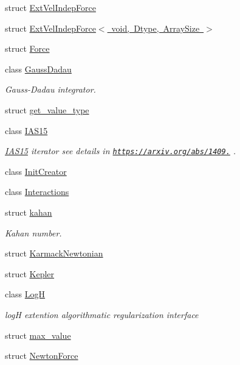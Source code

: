 \begin{DoxyCompactItemize}
struct \mbox{\hyperlink{struct_space_h_1_1_ext_vel_indep_force}{Ext\+Vel\+Indep\+Force}}
\item 
struct \mbox{\hyperlink{struct_space_h_1_1_ext_vel_indep_force_3_01void_00_01_dtype_00_01_array_size_01_4}{Ext\+Vel\+Indep\+Force$<$ void, Dtype, Array\+Size $>$}}
\item 
struct \mbox{\hyperlink{struct_space_h_1_1_force}{Force}}
\item 
class \mbox{\hyperlink{class_space_h_1_1_gauss_dadau}{Gauss\+Dadau}}
\begin{DoxyCompactList}\small\item\em Gauss-\/\+Dadau integrator. \end{DoxyCompactList}\item 
struct \mbox{\hyperlink{struct_space_h_1_1get__value__type}{get\+\_\+value\+\_\+type}}
\item 
class \mbox{\hyperlink{class_space_h_1_1_i_a_s15}{I\+A\+S15}}
\begin{DoxyCompactList}\small\item\em \mbox{\hyperlink{class_space_h_1_1_i_a_s15}{I\+A\+S15}} iterator see details in \href{https://arxiv.org/abs/1409.4779}{\tt https\+://arxiv.\+org/abs/1409.} . \end{DoxyCompactList}\item 
class \mbox{\hyperlink{class_space_h_1_1_init_creator}{Init\+Creator}}
\item 
class \mbox{\hyperlink{class_space_h_1_1_interactions}{Interactions}}
\item 
struct \mbox{\hyperlink{struct_space_h_1_1kahan}{kahan}}
\begin{DoxyCompactList}\small\item\em Kahan number. \end{DoxyCompactList}\item 
struct \mbox{\hyperlink{struct_space_h_1_1_karmack_newtonian}{Karmack\+Newtonian}}
\item 
struct \mbox{\hyperlink{struct_space_h_1_1_kepler}{Kepler}}
\item 
class \mbox{\hyperlink{class_space_h_1_1_log_h}{LogH}}
\begin{DoxyCompactList}\small\item\em logH extention algorithmatic regularization interface \end{DoxyCompactList}\item 
struct \mbox{\hyperlink{struct_space_h_1_1max__value}{max\+\_\+value}}
\item 
struct \mbox{\hyperlink{struct_space_h_1_1_newton_force}{Newton\+Force}}

\end{DoxyCompactItemize}

